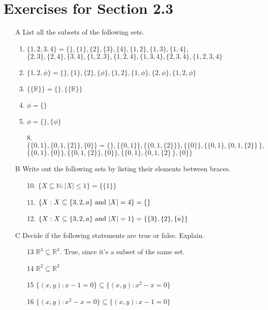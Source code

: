 \documentclass[12pt]{article}
\begin{document}
\section*{Exercises for Section 2.3}
    \begin{itemize}
	\item [A] List all the subsets of the following sets.
	    \begin{enumerate}
		\item $\{1,2,3,4\} = \{\}, \{1\}, \{2\}, \{3\}, \{4\}, \{1,2\},\{1,3\},\{1,4\},$\\
		    $\{2,3\}, \{2,4\}, \{3,4\}, \{1,2,3\}, \{1,2,4\}, \{1,3,4\}, \{2,3,4\}, \{1,2,3,4\} $
		\item $\{1,2,\phi\} = \{\}, \{1\}, \{2\}, \{\phi\}, \{1,2\}, \{1,\phi\}, \{2,\phi\}, \{1,2,\phi\}$
		\item $\{\{\mathbb{R}\}\} = \{\}, \{\{\mathbb{R}\}\}$
		\item $\phi = \{\}$
		\item $\phi = \{\}, \{\phi\}$
		\item [8.] $\{\{0,1\}, \{0,1,\{2\}\}, \{0\}\} = \{\}, \{\{0,1\}\}, \{\{0,1,\{2\}\}\}, \{\{0\}\}, \{\{0,1\}, \{0,1,\{2\}\}\,\},$\\
		    $\{\{0,1\}, \{0\}\}, \{\{0,1,\{2\}\}, \{0\}\}, \{\{0,1\}, \{0,1,\{2\}\,\}, \{0\}\}$
	    \end{enumerate}
	\item [B] Write out the following sets by listing their elements between braces.
	    \begin{itemize}
		\item [10.] $\{ X\subseteq \mathbb{N} : |X| \le 1\} = \{\{1\}\}$
		\item [11.] $\{X: X\subseteq \{3,2, a\} \ \textnormal{and} \  |X| = 4\} = \{\}$
		\item [12.] $\{X: X\subseteq \{3,2, a\} \ \textnormal{and} \  |X| = 1\} = \{\{3\}, \{2\}, \{a\}\}$
	    \end{itemize}
	\item [C] Decide if the following statements are true or false. Explain.
	    \begin{itemize}
		\item [13] $\mathbb{R}^3 \subseteq \mathbb{R}^3$. True, since it's a subset of the same set.
		\item [14] $\mathbb{R}^2 \subseteq \mathbb{R}^3$
		\item [15] $\{(x,y):x-1=0\} \subseteq \{(x,y):x^2-x=0\}$
		\item [16] $\{(x,y):x^2-x=0\}\subseteq\{(x,y):x-1=0\}$
	    \end{itemize}
    \end{itemize}
\end{document}
